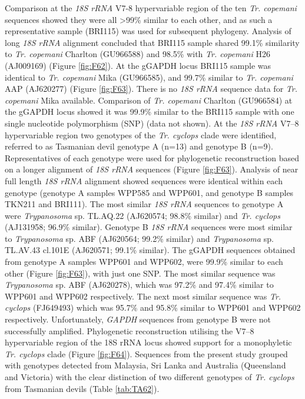\documentclass[a4paper, nobind]{templates/ociamthesis}
\begin{document}
Comparison at the \emph{18S rRNA} V7-8 hypervariable region of the ten \emph{Tr. copemani} sequences showed they were all \textgreater99\% similar to each other, and as such a representative sample (BRI115) was used for subsequent phylogeny.
Analysis of long \emph{18S rRNA} alignment concluded that BRI115 sample shared 99.1\% similarity to \emph{Tr. copemani} Charlton (GU966588) and 98.5\% with \emph{Tr. copemani} H26 (AJ009169) (Figure \ref{fig:F62}).
At the gGAPDH locus BRI115 sample was identical to \emph{Tr. copemani} Mika (GU966585), and 99.7\% similar to \emph{Tr. copemani} AAP (AJ620277) (Figure \ref{fig:F63}).
There is no \emph{18S rRNA} sequence data for \emph{Tr. copemani} Mika available.
Comparison of \emph{Tr. copemani} Charlton (GU966584) at the gGAPDH locus showed it was 99.9\% similar to the BRI115 sample with one single nucleotide polymorphism (SNP) (data not shown).
At the \emph{18S rRNA} V7--8 hypervariable region two genotypes of the \emph{Tr. cyclops} clade were identified, referred to as Tasmanian devil genotype A (n=13) and genotype B (n=9).
Representatives of each genotype were used for phylogenetic reconstruction based on a longer alignment of \emph{18S rRNA} sequences (Figure \ref{fig:F63}).
Analysis of near full length \emph{18S rRNA} alignment showed sequences were identical within each genotype (genotype A samples WPP585 and WPP601, and genotype B samples TKN211 and BRI111).
The most similar \emph{18S rRNA} sequences to genotype A were \emph{Trypanosoma} sp. TL.AQ.22 (AJ620574; 98.8\% similar) and \emph{Tr. cyclops} (AJ131958; 96.9\% similar).
Genotype B \emph{18S rRNA} sequences were most similar to \emph{Trypanosoma} sp. ABF (AJ620564; 99.2\% similar) and \emph{Trypanosoma} sp. TL.AV.43 cl.101E (AJ620571; 99.1\% similar).
The gGAPDH sequences obtained from genotype A samples WPP601 and WPP602, were 99.9\% similar to each other (Figure \ref{fig:F63}), with just one SNP.
The most similar sequence was \emph{Trypanosoma} sp. ABF (AJ620278), which was 97.2\% and 97.4\% similar to WPP601 and WPP602 respectively.
The next most similar sequence was \emph{Tr. cyclops} (FJ649493) which was 95.7\% and 95.8\% similar to WPP601 and WPP602 respectively.
Unfortunately, \emph{GAPDH} sequences from genotype B were not successfully amplified.
Phylogenetic reconstruction utilising the V7--8 hypervariable region of the 18S rRNA locus showed support for a monophyletic \emph{Tr. cyclops} clade (Figure \ref{fig:F64}).
Sequences from the present study grouped with genotypes detected from Malaysia, Sri Lanka and Australia (Queensland and Victoria) with the clear distinction of two different genotypes of \emph{Tr. cyclops} from Tasmanian devils (Table \ref{tab:TA62}).
\end{document}
